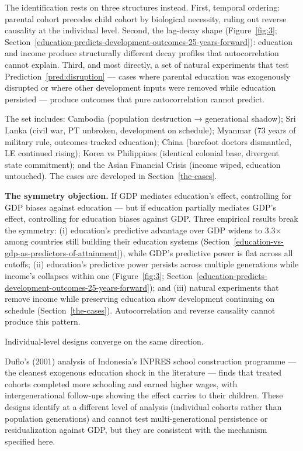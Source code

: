 \documentclass[12pt,letterpaper]{article}
\begin{document}
The identification rests on three
structures instead. First, temporal ordering: parental cohort precedes
child cohort by biological necessity, ruling out reverse causality at
the individual level. Second, the lag-decay shape (Figure~\ref{fig:3};
Section~\ref{education-predicts-development-outcomes-25-years-forward}):
education and income produce structurally different decay profiles that
autocorrelation cannot explain. Third, and most directly, a set of
natural experiments that test
Prediction~\ref{pred:disruption} --- cases where parental education was
exogenously disrupted or where other development inputs were removed
while education persisted --- produce outcomes that pure autocorrelation
cannot predict.

The set includes: Cambodia (population destruction →
generational shadow); Sri Lanka (civil war, PT unbroken, development on
schedule); Myanmar (73 years of military rule, outcomes tracked
education); China (barefoot doctors dismantled, LE continued rising);
Korea vs Philippines (identical colonial base, divergent state
commitment); and the Asian Financial Crisis (income wiped, education
untouched). The cases are developed in Section~\ref{the-cases}.

\textbf{The symmetry objection.} If GDP mediates education's effect,
controlling for GDP biases against education --- but if education
partially mediates GDP's effect, controlling for education biases against
GDP. Three empirical results break the symmetry: (i) education's
predictive advantage over GDP widens to 3.3× among countries still
building their education systems
(Section~\ref{education-vs-gdp-as-predictors-of-attainment}), while
GDP's predictive power is flat across all cutoffs; (ii) education's
predictive power persists across multiple generations while income's
collapses within one (Figure~\ref{fig:3};
Section~\ref{education-predicts-development-outcomes-25-years-forward});
and (iii) natural experiments that remove income while preserving
education show development continuing on schedule
(Section~\ref{the-cases}). Autocorrelation and reverse causality cannot
produce this pattern.

Individual-level designs converge on the same direction.

Duflo's (2001)
analysis of Indonesia's INPRES school construction programme ---
the cleanest exogenous education shock in the literature --- finds that
treated cohorts completed more schooling and earned higher wages,
with intergenerational follow-ups showing the effect carries to their
children. These designs identify at a different level of analysis
(individual cohorts rather than population generations) and cannot test
multi-generational persistence or residualization against GDP, but they
are consistent with the mechanism specified here.
\end{document}
